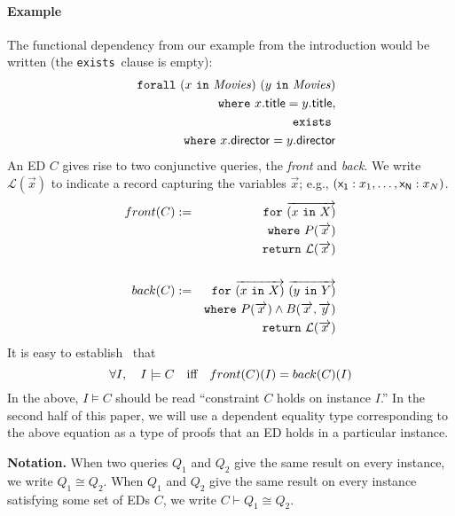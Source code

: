\documentclass[preprint]{sigplanconf}
\newcommand{\FOR}{{\tt for}\relax\ifmmode\ \else\xspace\fi}
\newcommand{\FORALL}{{\tt forall}\relax\ifmmode\ \else\xspace\fi}
\newcommand{\EXISTS}{{\tt exists}\relax\ifmmode\ \else\xspace\fi}
\newcommand{\WHERE}{{\tt where}\relax\ifmmode\ \else\xspace\fi}
\newcommand{\IN}{ \ {\tt in} \ }
\newcommand{\RETURN}{{\tt return}\relax\ifmmode\ \else\xspace\fi}
\newcommand{\relation}[1]{\ensuremath{\mathit{#1}}\xspace}
\begin{document}
\paragraph{Example}
The functional dependency from our example from the introduction would be written (the \EXISTS clause is empty):
\begin{eqnarray*}
& & \FORALL (x \IN \relation{Movies}) \ (y \IN \relation{Movies}) \\
& & \WHERE x.{\sf title} = y.{\sf title}, \\ 
& & \EXISTS \\
& & \WHERE x.{\sf director} = y.{\sf director}
\end{eqnarray*}
An ED $C$ gives rise to two conjunctive queries, the {\it front} and {\it back}.  We write $\mathcal{L}
(\overrightarrow{x})$ to indicate a record capturing the variables $\overrightarrow{x}
$; e.g., $({\sf x_1}: x_1, \ldots ,{\sf x_N}: x_N)$.  %
\begin{eqnarray*}
front(C)& := & \FOR \overrightarrow{(x \IN X)} \\ 
& & \WHERE P(\overrightarrow{x}) \\
& & \RETURN \mathcal{L}(\overrightarrow{x})  \\
& & \\
back(C) & := & \FOR \overrightarrow{(x \IN X)} \ \overrightarrow{(y \IN Y)} \\ 
& & \WHERE P(\overrightarrow{x}) \wedge B(\overrightarrow{x}, \overrightarrow{y}) \\
& & \RETURN \mathcal{L}(\overrightarrow{x})
\end{eqnarray*}
It is easy to establish~\cite{Popa99anequational} that 
\[
\forall I, \quad I \models C \quad \textnormal{iff} \quad front(C)(I) = back(C)(I)
\]
In the above, $I \models C$ should be read ``constraint $C$ holds on instance $I$.''
In the second half of this paper, we will use a dependent equality type corresponding to the above equation as a type of proofs that an ED holds in a particular instance.

\textbf{Notation.}  When two queries $Q_1$ and $Q_2$ give the same result on every instance, we write $Q_1 \cong Q_2$.  When $Q_1$ and $Q_2$ give the same result on every instance satisfying some set of EDs $C$, we write $C \vdash Q_1 \cong Q_2$.  
\end{document}
